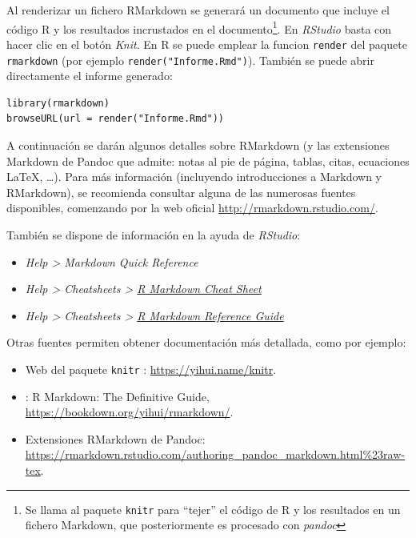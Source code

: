 \documentclass[
]{book}
\theoremstyle{definition}
\theoremstyle{definition}
\theoremstyle{definition}
\theoremstyle{definition}
\theoremstyle{remark}
\begin{document}
Al renderizar un fichero RMarkdown se generará un documento que incluye el código R
y los resultados incrustados en el documento\footnote{Se llama al paquete \texttt{knitr} para ``tejer'' el código de R y
  los resultados en un fichero Markdown, que posteriormente es procesado con \emph{pandoc}}.
En \emph{RStudio} basta con hacer clic en el botón \emph{Knit}.
En R se puede emplear la funcion \texttt{render} del paquete \texttt{rmarkdown}
(por ejemplo \texttt{render("Informe.Rmd")}).
También se puede abrir directamente el informe generado:

\begin{verbatim}
library(rmarkdown)
browseURL(url = render("Informe.Rmd"))
\end{verbatim}

A continuación se darán algunos detalles sobre RMarkdown (y las extensiones Markdown de Pandoc
que admite: notas al pie de página, tablas, citas, ecuaciones LaTeX, \ldots).
Para más información (incluyendo introducciones a Markdown y RMarkdown),
se recomienda consultar alguna de las numerosas fuentes disponibles,
comenzando por la web oficial \url{http://rmarkdown.rstudio.com/}.

También se dispone de información en la ayuda de \emph{RStudio}:

\begin{itemize}
\item
  \emph{Help \textgreater{} Markdown Quick Reference}
\item
  \emph{Help \textgreater{} Cheatsheets \textgreater{} \href{https://www.rstudio.org/links/r_markdown_cheat_sheet}{R Markdown Cheat Sheet}}
\item
  \emph{Help \textgreater{} Cheatsheets \textgreater{} \href{https://www.rstudio.com/wp-content/uploads/2015/03/rmarkdown-reference.pdf}{R Markdown Reference Guide}}
\end{itemize}

Otras fuentes permiten obtener documentación más detallada, como por ejemplo:

\begin{itemize}
\item
  Web del paquete \texttt{knitr} \citep{R-knitr}: \url{https://yihui.name/knitr}.
\item
  \citet{xie2018r} : R Markdown: The Definitive Guide,
  \url{https://bookdown.org/yihui/rmarkdown/}.
\item
  Extensiones RMarkdown de Pandoc: \url{https://rmarkdown.rstudio.com/authoring_pandoc_markdown.html\%23raw-tex}.
\end{itemize}
\end{document}
